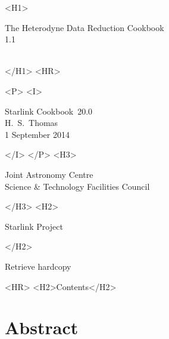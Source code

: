 \documentclass[twoside,11pt]{article}
\newcommand{\stardoccategory}  {Starlink Cookbook}
\newcommand{\stardocsource}    {sc\stardocnumber}
\newcommand{\stardocnumber}    {20.0}
\newcommand{\stardocauthors}   {H.\ S.\ Thomas}
\newcommand{\stardocdate}      {1 September 2014}
\newcommand{\stardoctitle}     {The Heterodyne Data Reduction Cookbook}
\newcommand{\stardocversion}   {1.1}
\newcommand{\stardocmanual}    {\ }
\newcommand{\htmladdnormallink}[2]{#1}
\newcommand{\htmladdimg}[1]{}
\newcommand{\htmlref}[2]{#1}
\newcommand{\htmladdtonavigation}[1]{}
\newcommand{\xlabel}[1]{}
\renewcommand{\_}{\texttt{\symbol{95}}}
\begin{document}
\begin{htmlonly}
   \xlabel{}
   \begin{rawhtml} <H1> \end{rawhtml}
      \stardoctitle\\
      \stardocversion\\
      \stardocmanual
   \begin{rawhtml} </H1> <HR> \end{rawhtml}


   \begin{rawhtml} <P> <I> \end{rawhtml}
   \stardoccategory\ \stardocnumber \\
   \stardocauthors \\
   \stardocdate
   \begin{rawhtml} </I> </P> <H3> \end{rawhtml}
      \htmladdnormallink{Joint Astronomy Centre}
                        {http://www.jach.hawaii.edu}\\
      \htmladdnormallink{Science \& Technology Facilities Council}
                        {http://www.scitech.ac.uk} \\
   \begin{rawhtml} </H3> <H2> \end{rawhtml}
      \htmladdnormallink{Starlink Project}{http://www.starlink.ac.uk/}
   \begin{rawhtml} </H2> \end{rawhtml}
   \htmladdnormallink{\htmladdimg{source.gif} Retrieve hardcopy}
      {http://www.starlink.ac.uk/cgi-bin/hcserver?\stardocsource}\\

  \label{stardoccontents}
  \begin{rawhtml}
    <HR>
    <H2>Contents</H2>
  \end{rawhtml}
  \htmladdtonavigation{\htmlref{\htmladdimg{contents_motif.gif}}
        {stardoccontents}}

  \section{\xlabel{abstract}Abstract}
\end{htmlonly}
\end{document}
